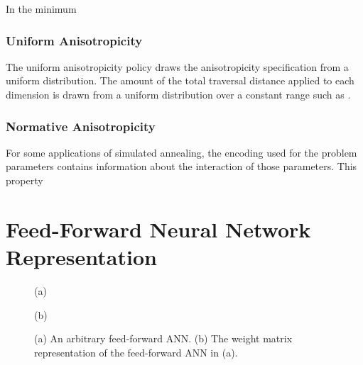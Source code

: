 \documentclass[11pt]{afthesis}
\begin{document}
	In the minimum 
	
	
	\subsubsection{Uniform Anisotropicity}
	
	The uniform anisotropicity policy draws the anisotropicity specification from a uniform distribution. The amount of the total traversal distance applied to each dimension is drawn from a uniform distribution over a constant range such as \begin{math}[0,1]\end{math}.
	
	\subsubsection{Normative Anisotropicity}
	
	For some applications of simulated annealing, the encoding used for the problem parameters contains information about the interaction of those parameters. This property
	
	
	\section{Feed-Forward Neural Network Representation}
	\label{scn:feed_forward_neural_network_representation}
	\begin{figure}
		
		\begin{minipage}[b]{0.48\linewidth}
			\centering
			\centerline{}
			\centerline{(a)}\medskip
		\end{minipage}
		\hfill
		\begin{minipage}[b]{0.48\linewidth}
			\centering
			\centerline{}
			\centerline{(b)}\medskip
		\end{minipage}
		\caption{
			(a) An arbitrary feed-forward ANN.
			(b) The weight matrix representation of the feed-forward ANN in (a).}
		\label{fig:nettomatmapping}
	\end{figure}
	
\end{document}
